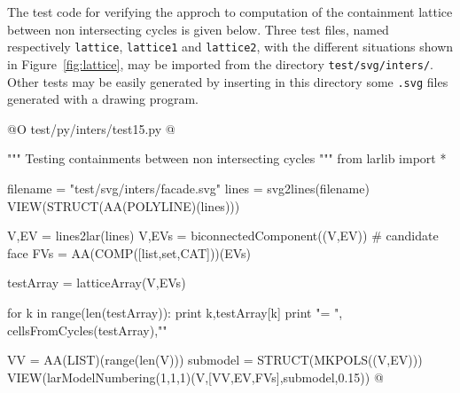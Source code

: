 \documentclass[11pt,oneside]{article}    %
\begin{document}
The test code for verifying the approch to computation of the containment lattice between non intersecting cycles is given below. Three test files, named respectively \texttt{lattice}, \texttt{lattice1} and \texttt{lattice2},  with the different situations shown in Figure~\ref{fig:lattice}, may be imported from the directory \texttt{test/svg/inters/}. Other tests may be easily generated by inserting in this directory some \texttt{.svg} files generated with a drawing program. 

@O test/py/inters/test15.py
@{""" Testing containments between non intersecting cycles """
from larlib import *

filename = "test/svg/inters/facade.svg"
lines = svg2lines(filename)
VIEW(STRUCT(AA(POLYLINE)(lines)))

V,EV = lines2lar(lines)
V,EVs = biconnectedComponent((V,EV))
# candidate face
FVs = AA(COMP([list,set,CAT]))(EVs)

testArray = latticeArray(V,EVs)

for k in range(len(testArray)):
	print k,testArray[k]
print "\ncells = ", cellsFromCycles(testArray),"\n"

VV = AA(LIST)(range(len(V)))
submodel = STRUCT(MKPOLS((V,EV)))
VIEW(larModelNumbering(1,1,1)(V,[VV,EV,FVs],submodel,0.15)) 
@}
\end{document}
